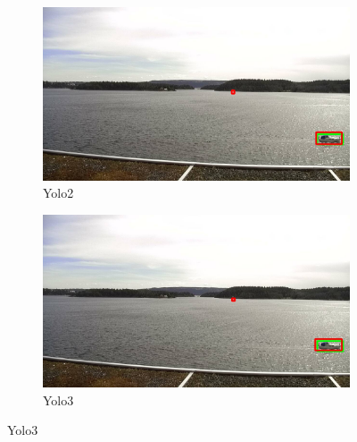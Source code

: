\begin{figure}[h!]
\begin{subfigure}{.5\textwidth}
  \centering
  \includegraphics[width=0.9\linewidth]{results/case_buildings/yolo23/samemistake/yolo2/selected_08_07_frame11155.jpg}
  \caption{Yolo2}
\end{subfigure}%
\begin{subfigure}{.5\textwidth}
  \centering
  \includegraphics[width=.9\linewidth]{results/case_buildings/yolo23/samemistake/yolo3/selected_08_07_frame11155.jpg}
  \caption{Yolo3}
\end{subfigure}


\end{figure}

